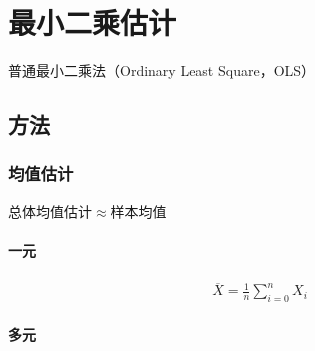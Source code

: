 \documentclass[12pt]{book}
\begin{document}
\section{最小二乘估计}





普通最小二乘法（Ordinary Least Square，OLS）

\subsection{方法}

\subsubsection{均值估计}
总体均值估计$\approx$样本均值

\paragraph{一元}

\begin{gather*}
    \overline{X}=\frac{1}{n}\sum_{i=0}^{n}X_i
\end{gather*}



\paragraph{多元}
\end{document}
